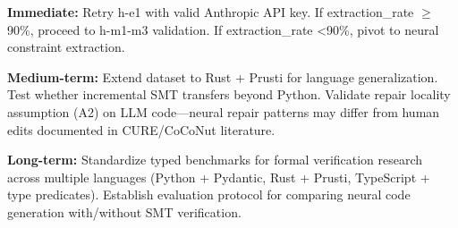 \textbf{Immediate:} Retry h-e1 with valid Anthropic API key. If extraction\_rate $\geq$90\%, proceed to h-m1-m3 validation. If extraction\_rate <90\%, pivot to neural constraint extraction.

\textbf{Medium-term:} Extend dataset to Rust + Prusti for language generalization. Test whether incremental SMT transfers beyond Python. Validate repair locality assumption (A2) on LLM code---neural repair patterns may differ from human edits documented in CURE/CoCoNut literature.

\textbf{Long-term:} Standardize typed benchmarks for formal verification research across multiple languages (Python + Pydantic, Rust + Prusti, TypeScript + type predicates). Establish evaluation protocol for comparing neural code generation with/without SMT verification.
